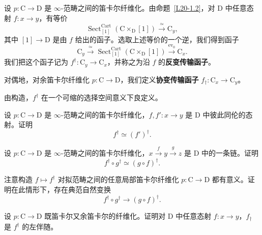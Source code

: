 \begin{construction}\label{L20-1.3}
设 $p\colon \mathrm{C}\to\mathrm{D}$ 是 $\infty$-范畴之间的笛卡尔纤维化。由命题~\ref{L20-1.2}，对 $\mathrm{D}$ 中任意态射 $f\colon x\to y$，有等价
\[
\operatorname{Sect}^{\mathrm{Cart}}_{[1]}(\mathrm{C}\times_{\mathrm{D}}[1])\xrightarrow{\ \simeq\ }\mathrm{C}_y,
\]
其中 $[1]\to\mathrm{D}$ 是由 $f$ 给出的函子。选取上述等价的一个逆，我们得到函子
\[
\mathrm{C}_y\xrightarrow{\ \simeq\ }\operatorname{Sect}^{\mathrm{Cart}}_{[1]}(\mathrm{C}\times_{\mathrm{D}}[1])\xrightarrow{\mathrm{ev}_0}\mathrm{C}_x.
\]
我们把这个函子记为 $f^{\dagger}\colon\mathrm{C}_y\to\mathrm{C}_x$，并称之为沿 $f$ 的\textbf{反变传输函子}。

对偶地，对余笛卡尔纤维化 $p\colon \mathrm{C}\to\mathrm{D}$，我们定义\textbf{协变传输函子} $f_{\dagger}\colon\mathrm{C}_x\to\mathrm{C}_y$。
\end{construction}


\nitem\label{L20-1.4} 由构造，$f^{\dagger}$ 在一个可缩的选择空间意义下良定义。

\begin{exercise}\label{L20-1.5}
设 $p\colon \mathrm{C}\to\mathrm{D}$ 是 $\infty$-范畴之间的笛卡尔纤维化，$f,f'\colon x\to y$ 是 $\mathrm{D}$ 中彼此同伦的态射。证明
\[
f^{\dagger}\simeq(f')^{\dagger}.
\]
\end{exercise}

\begin{exercise}\label{L20-1.6}
设 $p\colon \mathrm{C}\to\mathrm{D}$ 是 $\infty$-范畴之间的笛卡尔纤维化，$x\xrightarrow{f}y\xrightarrow{g}z$ 是 $\mathrm{D}$ 中的一条链。证明
\[
f^{\dagger}\circ g^{\dagger}\simeq(g\circ f)^{\dagger}.
\]
\end{exercise}

\begin{exercise}\label{L20-1.7}
注意构造 $f\mapsto f^{\dagger}$ 对拟范畴之间的任意局部笛卡尔纤维化 $p\colon\mathrm{C}\to\mathrm{D}$ 都有意义。证明在此情形下，存在典范自然变换
\[
f^{\dagger}\circ g^{\dagger}\to(g\circ f)^{\dagger}.
\]
\end{exercise}

\begin{exercise}\label{L20-1.8}
设 $p\colon \mathrm{C}\to\mathrm{D}$ 既笛卡尔又余笛卡尔的纤维化。证明对 $\mathrm{D}$ 中任意态射 $f\colon x\to y$，$f_{\dagger}$ 是 $f^{\dagger}$ 的左伴随。
\end{exercise}


